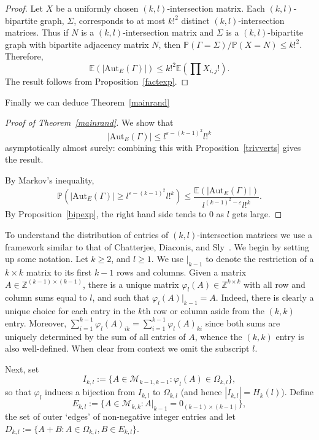 \documentclass{daj}
\newcommand\Aut{\mathrm{Aut}}
\newcommand\M{\mathcal{M}}
\newcommand\Z{\mathbb{Z}}
\theoremstyle{plain}
\theoremstyle{definition}
\begin{document}
\begin{proof}
Let $X$ be a uniformly chosen $(k,l)$-intersection matrix. Each $(k,l)$-bipartite graph, $\Sigma$, corresponds to at most 
$k!^2$ distinct $(k,l)$-intersection matrices. 
Thus if $N$ is a $(k,l)$-intersection matrix and $\Sigma$ is a $(k,l)$-bipartite graph with bipartite adjacency matrix $N$, then $\mathbb{P}(\Gamma=\Sigma)/\mathbb{P}(X=N)\leq k!^2.$ Therefore, $$\mathbb{E}(|\Aut_{E}(\Gamma)|)\leq k!^2\mathbb{E}\left(\prod X_{i,j}!\right).$$ The result follows from Proposition~\ref{factexp}.
\end{proof}
Finally we can deduce Theorem~\ref{mainrand}
\begin{proof}[Proof of Theorem~\ref{mainrand}]
We show that $$|\Aut_E(\Gamma)| \leq l^{\varepsilon-{(k-1)}^2}l!^k$$ asymptotically almost surely: combining this with Proposition~\ref{trivverts} gives the result.

By Markov's inequality, $$\mathbb{P}\left(|\Aut_E(\Gamma)|\geq l^{\varepsilon-{(k-1)}^2}l!^k\right)\leq \frac{\mathbb{E}(|\Aut_{E}(\Gamma)|)}{l^{{(k-1)}^2-\varepsilon}l!^k}.$$ By Proposition~\ref{bipexp}, the right hand side tends to 0 as $l$ gets large.
\end{proof}

To understand the distribution of entries of $(k,l)$-intersection matrices we use a framework similar to that of Chatterjee, Diaconis, and Sly~\cite{cds}. We begin by setting up some notation.
Let $k\geq 2$, and $l\geq 1$. We use $|_{k-1}$ to denote the restriction of a $k\times k$ matrix to its first $k-1$ rows and columns. Given a matrix $A\in\mathbb{Z}^{(k-1)\times (k-1)}$, there is a unique matrix $\varphi_l(A)\in\Z^{k\times k}$ with all row and column sums equal to $l$, and such that $\varphi_l(A)|_{k-1}=A$. Indeed, there is clearly a unique choice for each entry in the $k$th row or column aside from the $(k,k)$ entry. Moreover, $\sum_{i=1}^{k-1} \varphi_l(A)_{ik}=\sum_{i=1}^{k-1} \varphi_l(A)_{ki}$ since both sums are uniquely determined by the sum of all entries of $A$, whence the $(k,k)$ entry is also well-defined. When clear from context we omit the subscript $l$.

Next, set $$I_{k,l}:=\{A\in\M_{k-1,k-1} : \varphi_l(A)\in\Omega_{k,l}\},$$ so that $\varphi_l$ induces a bijection from $I_{k,l}$ to $\Omega_{k,l}$ (and hence $|I_{k,l}|=H_{k}(l)$). Define $$E_{k,l}:=\{A\in \M_{k,k} : A|_{k-1}=0_{(k-1)\times (k-1)}\},$$ the set of outer `edges' of non-negative integer entries and let $D_{k,l}:=\{A+B : A\in\Omega_{k,l}, B\in E_{k,l}\}$. 
\end{document}
